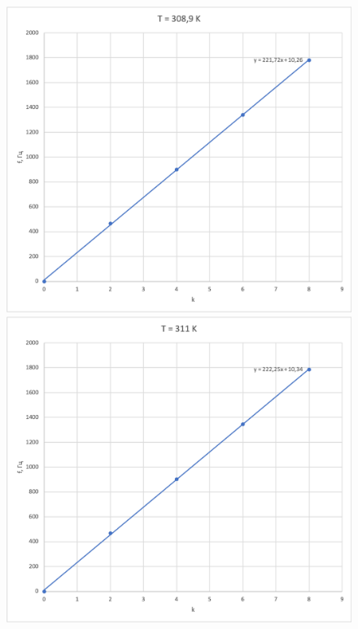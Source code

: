 \documentclass[a4paper, 12pt]{article}
\begin{document}
\begin{enumerate}
        \begin{figure}[ph]
            \begin{minipage}[h]{0.5\linewidth}
                \includegraphics[width=1\linewidth]{7.png}    
            \end{minipage}
            \hfill
            \begin{minipage}[h]{0.5\linewidth}
                \includegraphics[width=1\linewidth]{8.png}    

\end{minipage}
\end{figure}
\end{enumerate}
\end{document}
